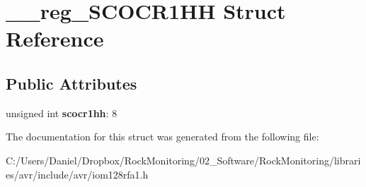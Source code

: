 \hypertarget{struct____reg___s_c_o_c_r1_h_h}{}\section{\+\_\+\+\_\+reg\+\_\+\+S\+C\+O\+C\+R1\+HH Struct Reference}
\label{struct____reg___s_c_o_c_r1_h_h}
\subsection*{Public Attributes}
\begin{DoxyCompactItemize}
\item 
unsigned int {\bfseries scocr1hh}\+: 8\hypertarget{struct____reg___s_c_o_c_r1_h_h_ac2fc17babdf020b385692927432d278b}{}\label{struct____reg___s_c_o_c_r1_h_h_ac2fc17babdf020b385692927432d278b}

\end{DoxyCompactItemize}


The documentation for this struct was generated from the following file\+:\begin{DoxyCompactItemize}
\item 
C\+:/\+Users/\+Daniel/\+Dropbox/\+Rock\+Monitoring/02\+\_\+\+Software/\+Rock\+Monitoring/libraries/avr/include/avr/iom128rfa1.\+h\end{DoxyCompactItemize}
